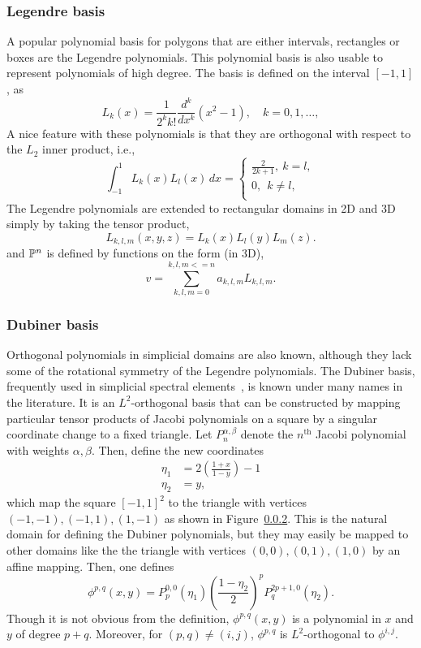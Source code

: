 \subsubsection{Legendre basis}

A popular polynomial basis for polygons that are either intervals, rectangles or boxes are the Legendre polynomials.
This polynomial basis is also usable to represent polynomials of high degree.
The basis is defined on the interval $[-1,1]$, as
\[
L_k(x) = \frac{1}{2^k k!} \frac{d^k}{dx^k} (x^2 -1), \quad k=0,1,\ldots,
\]
A nice feature with these polynomials is that they are orthogonal
with respect to the $L_2$ inner product, i.e.,
\[
\int_{-1}^1 L_k (x) L_l(x) \, dx  =
\left\{
\begin{array}{c}
\frac{2}{2k+1}, \ k=l, \\
0 , \ \ k\not= l, \\
\end{array}
\right.
\]
The Legendre polynomials are extended to rectangular domains in 2D and
3D simply by taking the tensor product,
\[
L_{k,l,m}(x,y,z) = L_k(x) L_l(y) L_m(z) .
\]
and $\P^n$ is defined by functions on the form (in 3D),
\[
v = \sum_{k,l,m=0}^{k,l,m <= n}   a_{k,l,m} L_{k,l,m} .
\]

\subsubsection{Dubiner basis}

Orthogonal polynomials in simplicial domains are also known, although
they lack some of the rotational symmetry of the Legendre polynomials.
The Dubiner basis, frequently used in simplicial spectral
elements~\cite{}, is known under many names in the literature.  It is
an \( L^2 \)-orthogonal basis that can be constructed by mapping particular
tensor products of Jacobi polynomials on a square by a singular
coordinate change to a fixed triangle.
Let \( P^{\alpha,\beta}_n \) denote the \( n^\mathrm{th} \) Jacobi
polynomial with weights \( \alpha, \beta \).  Then, define the
new coordinates
\begin{equation}
\label{eq:dubcoord}
\begin{split}
\eta_1 & = 2\left(\frac{1+x}{1-y}\right)-1 \\
\eta_2 & = y,
\end{split}
\end{equation}
which map the square \( [-1,1]^2 \) to the triangle with
vertices \( (-1,-1),(-1,1),(1,-1) \) as shown in Figure~\ref{}.  This
is the natural domain for defining the Dubiner polynomials, but they
may easily be mapped to other domains like the the triangle with
vertices
\( (0,0) , (0,1) , (1,0) \) by an affine mapping.
Then, one defines
\begin{equation}
\phi^{p,q}(x,y) = P_p^{0,0}(\eta_1) \left( \frac{1-\eta_2}{2}
\right)^p P_q^{2p+1,0}(\eta_2).
\end{equation}
Though it is not obvious from the definition, \( \phi^{p,q}(x,y) \) is
a polynomial in \( x \) and \( y \) of degree \( p + q \).  Moreover,
for \( (p,q) \neq (i,j) \), \( \phi^{p,q} \) is \( L^2 \)-orthogonal to \(
\phi^{i,j} \).

